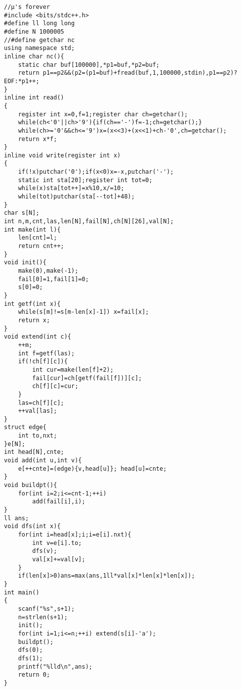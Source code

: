 \begin{verbatim}
//μ's forever
#include <bits/stdc++.h>
#define ll long long 
#define N 1000005
//#define getchar nc
using namespace std;
inline char nc(){
    static char buf[100000],*p1=buf,*p2=buf;
    return p1==p2&&(p2=(p1=buf)+fread(buf,1,100000,stdin),p1==p2)?EOF:*p1++;
}
inline int read()
{
    register int x=0,f=1;register char ch=getchar();
    while(ch<'0'||ch>'9'){if(ch=='-')f=-1;ch=getchar();}
    while(ch>='0'&&ch<='9')x=(x<<3)+(x<<1)+ch-'0',ch=getchar();
    return x*f;
}
inline void write(register int x)
{
    if(!x)putchar('0');if(x<0)x=-x,putchar('-');
    static int sta[20];register int tot=0;
    while(x)sta[tot++]=x%10,x/=10;
    while(tot)putchar(sta[--tot]+48);
}
char s[N];
int n,m,cnt,las,len[N],fail[N],ch[N][26],val[N];
int make(int l){
    len[cnt]=l;
    return cnt++;
}
void init(){
    make(0),make(-1);
    fail[0]=1,fail[1]=0;
    s[0]=0;
}
int getf(int x){
    while(s[m]!=s[m-len[x]-1]) x=fail[x];
    return x;
}
void extend(int c){
    ++m;
    int f=getf(las);
    if(!ch[f][c]){
        int cur=make(len[f]+2);
        fail[cur]=ch[getf(fail[f])][c];
        ch[f][c]=cur;
    }
    las=ch[f][c];
    ++val[las];
}
struct edge{
    int to,nxt;
}e[N];
int head[N],cnte;
void add(int u,int v){
    e[++cnte]=(edge){v,head[u]}; head[u]=cnte;
}
void buildpt(){
    for(int i=2;i<=cnt-1;++i)
        add(fail[i],i);
}
ll ans;
void dfs(int x){
    for(int i=head[x];i;i=e[i].nxt){
        int v=e[i].to;
        dfs(v);
        val[x]+=val[v];
    }
    if(len[x]>0)ans=max(ans,1ll*val[x]*len[x]*len[x]);
}
int main()
{
    scanf("%s",s+1);
    n=strlen(s+1);
    init();
    for(int i=1;i<=n;++i) extend(s[i]-'a');
    buildpt();
    dfs(0);
    dfs(1);
    printf("%lld\n",ans);
    return 0;
}
\end{verbatim}
